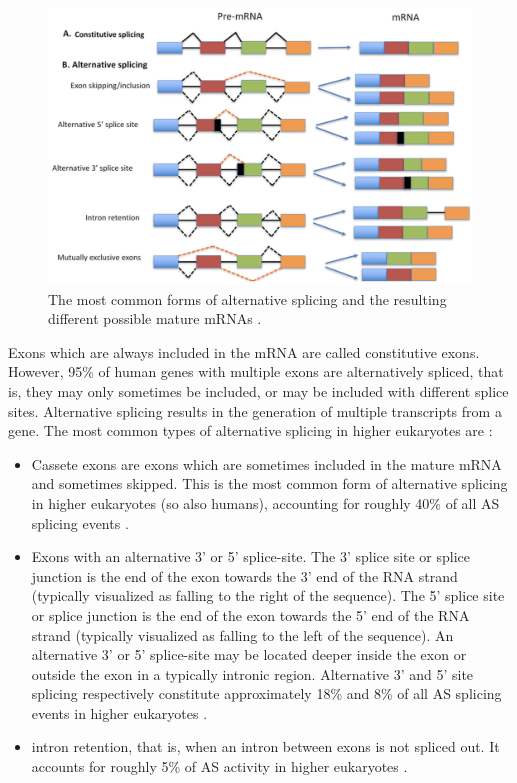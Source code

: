 \begin{figure}[h]
	\centering\includegraphics[width=1\textwidth]{../visualizations/ch2-biobackground/alternative_splicing_forms.png} 
	\caption
	{The most common forms of alternative splicing and the resulting different possible mature mRNAs \cite{img:altsplicingforms}.
	}
	\label{fig:altsplicingforms}
\end{figure}

Exons which are always included in the mRNA are called constitutive exons. However, 95\% of human genes with multiple exons are alternatively spliced, that is, they may only sometimes be included, or may be included with different splice sites. Alternative splicing results in the generation of multiple transcripts from a gene. The most common types of alternative splicing in higher eukaryotes are \cite{commonsplicing1}\cite{commonsplicing2}:

\begin{itemize}
\item Cassete exons are exons which are sometimes included in the mature mRNA and sometimes skipped. This is the most common form of alternative splicing in higher eukaryotes (so also humans), accounting for roughly 40\% of all AS splicing events \cite{splicing_current_perspectives}.
\item Exons with an alternative 3' or 5' splice-site. The 3' splice site or splice junction is the end of the exon towards the 3' end of the RNA strand (typically visualized as falling to the right of the sequence). The 5' splice site or splice junction is the end of the exon towards the 5' end of the RNA strand (typically visualized as falling to the left of the sequence). An alternative 3' or 5' splice-site may be located deeper inside the exon or outside the exon in a typically intronic region. Alternative 3' and 5' site splicing respectively constitute approximately 18\% and 8\% of all AS splicing events in higher eukaryotes \cite{splicing_current_perspectives}. 
\item intron retention, that is, when an intron between exons is not spliced out. It accounts for roughly 5\% of AS activity in higher eukaryotes \cite{splicing_current_perspectives}.
\end{itemize}


